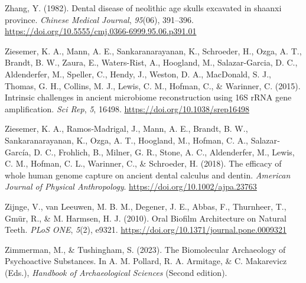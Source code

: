 \documentclass[
  letterpaper,
]{book}
\newlength{\cslhangindent}
\newlength{\cslentryspacingunit} %
\newenvironment{CSLReferences}[2] %
 {%
  \setlength{\parindent}{0pt}
  \ifodd #1
  \let\oldpar\par
  \def\par{\hangindent=\cslhangindent\oldpar}
  \fi
  \setlength{\parskip}{#2\cslentryspacingunit}
 }%
 {}
\begin{document}
\begin{CSLReferences}{1}{0}
\leavevmode{}%
Zhang, Y. (1982). Dental disease of neolithic age skulls excavated in
shaanxi province. \emph{Chinese Medical Journal}, \emph{95}(06),
391--396. \url{https://doi.org/10.5555/cmj.0366-6999.95.06.p391.01}

\leavevmode{}%
Ziesemer, K. A., Mann, A. E., Sankaranarayanan, K., Schroeder, H., Ozga,
A. T., Brandt, B. W., Zaura, E., Waters-Rist, A., Hoogland, M.,
Salazar-Garcia, D. C., Aldenderfer, M., Speller, C., Hendy, J., Weston,
D. A., MacDonald, S. J., Thomas, G. H., Collins, M. J., Lewis, C. M.,
Hofman, C., \& Warinner, C. (2015). Intrinsic challenges in ancient
microbiome reconstruction using {16S rRNA} gene amplification. \emph{Sci
Rep}, \emph{5}, 16498. \url{https://doi.org/10.1038/srep16498}

\leavevmode{}%
Ziesemer, K. A., Ramos‐Madrigal, J., Mann, A. E., Brandt, B. W.,
Sankaranarayanan, K., Ozga, A. T., Hoogland, M., Hofman, C. A.,
Salazar‐García, D. C., Frohlich, B., Milner, G. R., Stone, A. C.,
Aldenderfer, M., Lewis, C. M., Hofman, C. L., Warinner, C., \&
Schroeder, H. (2018). The efficacy of whole human genome capture on
ancient dental calculus and dentin. \emph{American Journal of Physical
Anthropology}. \url{https://doi.org/10.1002/ajpa.23763}

\leavevmode{}%
Zijnge, V., van Leeuwen, M. B. M., Degener, J. E., Abbas, F., Thurnheer,
T., Gmür, R., \& M. Harmsen, H. J. (2010). Oral {Biofilm Architecture}
on {Natural Teeth}. \emph{PLoS ONE}, \emph{5}(2), e9321.
\url{https://doi.org/10.1371/journal.pone.0009321}

\leavevmode{}%
Zimmerman, M., \& Tushingham, S. (2023). The {Biomolecular Archaeology}
of {Psychoactive Substances}. In A. M. Pollard, R. A. Armitage, \& C.
Makarevicz (Eds.), \emph{Handbook of {Archaeological Sciences}} (Second
edition).

\end{CSLReferences}

\backmatter
\end{document}
